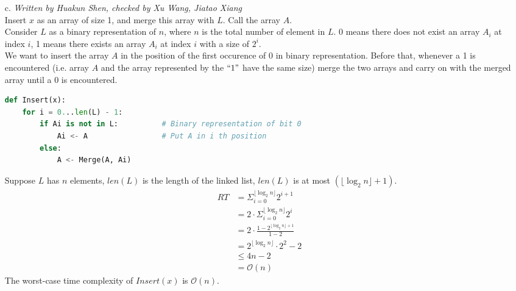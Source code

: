 \documentclass[10pt]{article}
\begin{document}
\begin{itemize}
\item[c.]\textit{Written by Huakun Shen, checked by Xu Wang, Jiatao Xiang}\\
Insert $x$ as an array of size 1, and merge this array with $L$. Call the array $A$.\\
Consider $L$ as a binary representation of $n$, where $n$ is the total number of element in $L$. 0 means there does not exist an array $A_i$ at index $i$, 1 means there exists an array $A_i$ at index $i$ with a size of $2^i$.\\
We want to insert the array $A$ in the position of the first occurence of 0 in binary representation. Before that, whenever a 1 is encountered (i.e. array $A$ and the array represented by the $``1"$ have the same size) merge the two arrays and carry on with the merged array until a 0 is encountered.
\begin{lstlisting}[language=Python]
def Insert(x):
	for i = 0...len(L) - 1:
		if Ai is not in L:			# Binary representation of bit 0
			Ai <- A					# Put A in i th position
		else:
			A <- Merge(A, Ai)
\end{lstlisting}
Suppose $L$ has $n$ elements, $len(L)$ is the length of the linked list, $len(L)$ is at most $(\lfloor\log_2n\rfloor + 1)$.
\begin{align*}
RT &= \Sigma^{\lfloor\log_2n\rfloor}_{i=0}2^{i+1}\\
&=2\cdot\Sigma^{\lfloor\log_2n\rfloor}_{i=0}2^i\\
&=2\cdot\frac{1-2^{\lfloor\log_2n\rfloor+1}}{1-2}\\
&=2^{\lfloor\log_2n\rfloor}\cdot2^2-2\\
&\leq 4n-2\\
&=\mathcal{O}(n)
\end{align*}
The worst-case time complexity of $Insert(x)$ is $\mathcal{O}(n)$.


\end{itemize}
\end{document}
